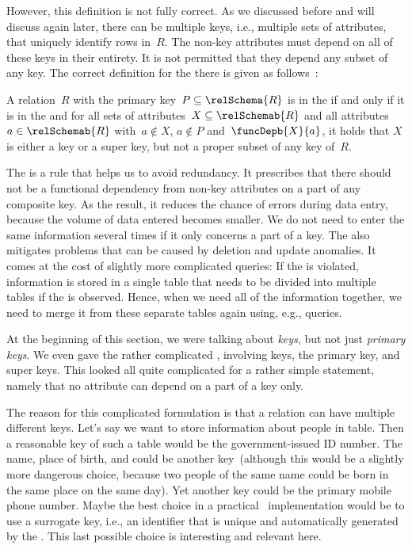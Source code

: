 However, this definition is not fully correct.
As we discussed before and will discuss again later, there can be multiple keys, i.e., multiple sets of attributes, that uniquely identify rows in~$R$.
The non-key attributes must depend on all of these keys in their entirety.
It is not permitted that they depend any subset of any key.
The correct definition for the  there is given as follows~\cite{SS2005EIDDDFDB:SDWSD2}:%
%
\begin{definition}%
\label{def:2nf}%
A relation~$R$ with the primary key~$P\subseteq\relSchema{R}$ is in the  if and only if it is in the  and for all sets of attributes~$X\subseteq\relSchemab{R}$ and all attributes~$a\in\relSchemab{R}$ with~$a\not\in X$, $a\not\in P$ and~$\funcDepb{X}{a}$, it holds that $X$ is either a key or a super key, but not a proper subset of any key of~$R$.%
\end{definition}%
%
%
%
%
%
The  is a rule that helps us to avoid redundancy.
It prescribes that there should not be a functional dependency from non-key attributes on a part of any composite key.
As the result, it reduces the chance of errors during data entry, because the volume of data entered becomes smaller.
We do not need to enter the same information several times if it only concerns a part of a key.
The  also mitigates problems that can be caused by deletion and update anomalies.
It comes at the cost of slightly more complicated queries:
If the  is violated, information is stored in a single table that needs to be divided into multiple tables if the  is observed.
Hence, when we need all of the information together, we need to merge it from these separate tables again using, e.g.,  queries.

At the beginning of this section,  we were talking about \emph{keys}, but not just \emph{primary keys}.
We even gave the rather complicated , involving keys, the primary key, and super keys.
This looked all quite complicated for a rather simple statement, namely that no attribute can depend on a part of a key only.

The reason for this complicated formulation is that a relation can have multiple different keys.
Let's say we want to store information about people in table.
Then a reasonable key of such a table would be the government-issued ID number.
The name, place of birth, and  could be another key~(although this would be a slightly more dangerous choice, because two people of the same name could be born in the same place on the same day).
Yet another key could be the primary mobile phone number.
Maybe the best choice in a practical \db\ implementation would be to use a surrogate key, i.e., an identifier
that is unique and automatically generated by the \dbms.
This last possible choice is interesting and relevant here.

